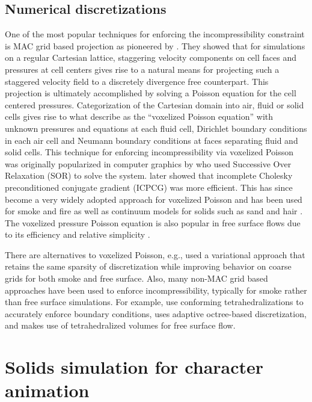 	\subsection{Numerical discretizations}
	One of the most popular techniques for enforcing the
        incompressibility constraint is MAC grid based projection as
        pioneered by \cite{HW65}. They showed that for simulations on
        a regular
Cartesian lattice, staggering velocity components on cell faces and pressures at cell centers gives rise to a natural means for projecting such a staggered velocity field to a discretely
divergence free counterpart. This projection is ultimately accomplished by solving a Poisson equation for the cell centered pressures. Categorization of the Cartesian domain into air,
fluid or solid cells gives rise to what \cite{BBB07} describe as the ``voxelized Poisson equation'' with unknown pressures and equations at each fluid cell, Dirichlet boundary conditions
in each air cell and Neumann boundary conditions at faces separating fluid and solid cells. This technique for enforcing incompressibility via voxelized Poisson was originally
popularized in computer graphics by \cite{Foster:1996:RAO} who used Successive Over Relaxation (SOR) to solve the system. \cite{FF01} later showed that incomplete Cholesky preconditioned conjugate
gradient (ICPCG) was more efficient. This has since become a very
widely adopted approach for voxelized Poisson and has been used for
smoke \cite{SRF05,MTPS04,FSJ01} and fire \cite{HG09} as well as
continuum models for solids such as sand \cite{zhu:2005:sand} and hair
\cite{MSWST09}. The voxelized pressure Poisson equation is also popular in free surface flows due to its efficiency and relative simplicity
\cite{CMT04,FF01,GBO04,HK05,HLYK08,KC07,MTPS04,NNSM08,WMT05,zhu:2005:sand}. 

There are alternatives to voxelized Poisson, e.g., \cite{BBB07} used a
variational approach that retains the same sparsity of discretization
while improving behavior on coarse grids for both smoke and free surface. Also, many non-MAC grid based approaches have been used to enforce incompressibility, typically for smoke rather than free surface simulations. For example, \cite{MCPTD09,KFCO06,FOK05,ETKSD07} use conforming tetrahedralizations to accurately enforce boundary conditions, \cite{LGF04} uses adaptive octree-based discretization, and \cite{CNF07} makes use of tetrahedralized volumes for free surface flow.

\section{Solids simulation for character animation}
